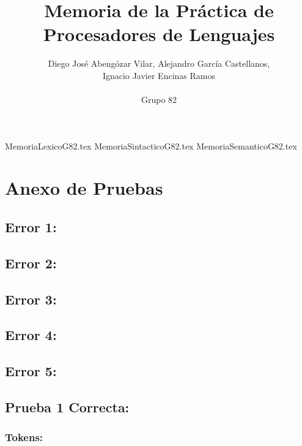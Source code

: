 \documentclass[a4paper, 12pt]{article}
\title{Memoria de la Práctica de Procesadores de Lenguajes}
\author{Diego José Abengózar Vilar, Alejandro García Castellanos,\\ Ignacio Javier Encinas Ramos\\\\Grupo 82}
\begin{document}
\maketitle
\tableofcontents
\newpage
{MemoriaLexicoG82.tex}
\newpage
{MemoriaSintacticoG82.tex}
\newpage
{MemoriaSemanticoG82.tex}
\newpage
\section{Anexo de Pruebas}
\subsection*{Error 1:}



\subsection*{Error 2:}



\subsection*{Error 3:}


\newpage
\subsection*{Error 4:}



\subsection*{Error 5:}


\newpage
\subsection*{Prueba 1 Correcta:}

\subsubsection*{Tokens:}

\end{document}
